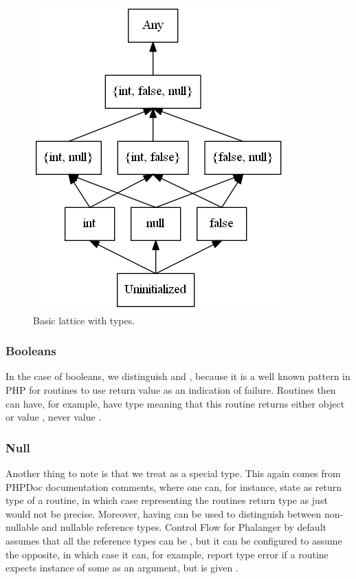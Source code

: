         \begin{figure}[h]  
          \centering        
          \includegraphics[scale=0.6]{graphs/types-lattice1.png}
          \caption{Basic lattice with types.\label{typeslattice1}}    
        \end{figure}
        
        \subsubsection*{Booleans}        
        In the case of booleans, we distinguish 
         and , because it is a well 
        known pattern in PHP for routines to use  
        return value as an indication of failure. 
        Routines then can have, for example, have type 
         meaning that this routine returns either 
        object or value , never value .
        
        \subsubsection*{Null}        
        Another thing to note is that we treat  as 
        a special type. This again comes from PHPDoc documentation 
        comments, where one can, for instance, state 
         as return type of a routine, 
        in which case representing the routines return type 
        as just  would not be precise. Moreover, 
        having  can be used to distinguish between 
        non-nullable and nullable reference types. 
        Control Flow for Phalanger by default assumes that all 
        the reference types can be , but it can 
        be configured to assume the opposite, in which case it can, 
        for example, report type error if a routine expects 
        instance of some  as an argument, 
        but is given .
        
